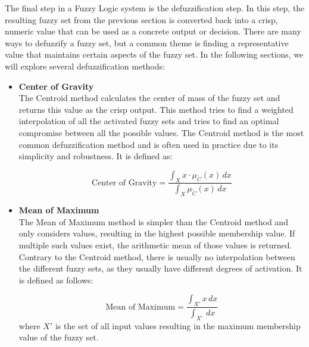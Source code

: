 The final step in a Fuzzy Logic system is the defuzzification step. In this step, the resulting fuzzy set from the previous section is converted back into a crisp, numeric value that can be used as a concrete output or decision. There are many ways to defuzzify a fuzzy set, but a common theme is finding a representative value that maintains certain aspects of the fuzzy set. In the following sections, we will explore several defuzzification methods:

\begin{itemize}
      \item \textbf{Center of Gravity} \\
            The Centroid method calculates the center of mass of the fuzzy set and returns this value as the crisp output. This method tries to find a weighted interpolation of all the activated fuzzy sets and tries to find an optimal compromise between all the possible values. The Centroid method is the most common defuzzification method and is often used in practice due to its simplicity and robustness. It is defined as:

            \begin{equation}
                  \text{Center of Gravity} = \frac{\int_X x \cdot \mu_{\tilde{C}}(x) \, dx}{\int_X \mu_{\tilde{C}}(x) \, dx}
            \end{equation}

      \item \textbf{Mean of Maximum} \\
            The Mean of Maximum method is simpler than the Centroid method and only considers values, resulting in the highest possible membership value. If multiple such values exist, the arithmetic mean of those values is returned. Contrary to the Centroid method, there is usually no interpolation between the different fuzzy sets, as they usually have different degrees of activation. It is defined as follows:

            \begin{equation}
                  \text{Mean of Maximum} = \frac{\int_{X'} x \, dx}{\int_{X'}  \, dx}
            \end{equation}
            where $X'$ is the set of all input values resulting in the maximum membership value of the fuzzy set.
\end{itemize}
